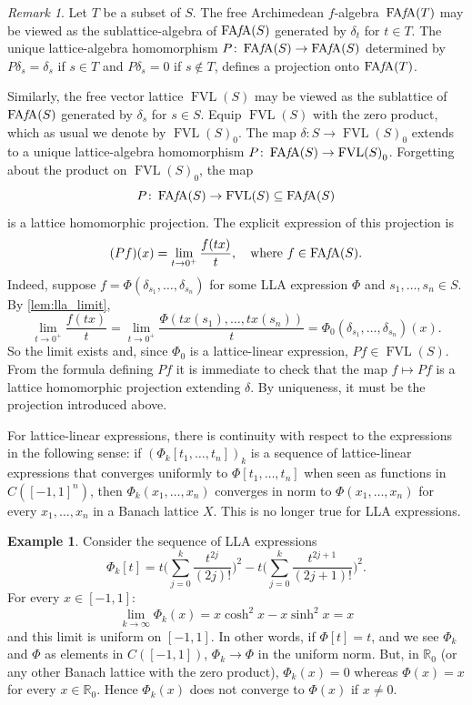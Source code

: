 \documentclass{memo-l}
\theoremstyle{definition}
\newtheorem{example}[theorem]{Example}
\theoremstyle{remark}
\newtheorem{rem}[theorem]{Remark}
\numberwithin{section}{chapter}
\numberwithin{equation}{chapter}
\newcommand\R{\ensuremath{\mathbb{R}}}
\newcommand{\falg}{$f\!$-algebra}
\newcommand{\FAFA}[1]{\operatorname{FA{\it f}\!A}(#1)}
\newcommand{\FVL}[1]{\operatorname{FVL}(#1)}
\begin{document}
\begin{rem}\label{rem:FVLinFAFA}
    Let $T$ be a subset of $S$. The free Archimedean \falg\ $\FAFA T$ may be viewed as the
    sublattice-algebra of $\FAFA S$ generated by $\delta _t$ for $t
    \in T$. The unique lattice-algebra homomorphism $P\colon \FAFA S\to \FAFA
    S$ determined by $P\delta _s=\delta _s$ if $s \in T$ and $P\delta
    _s=0$ if $s \not\in T$, defines a projection onto $\FAFA T$.

    Similarly, the free vector lattice $\FVL S$ may be viewed as the sublattice of $\FAFA S$
    generated by $\delta _s$ for $s \in S$. Equip $\FVL S$ with
    the zero product, which as usual we denote by ${\FVL S}_0$. The map $\delta \colon S\to {\FVL S}_0$
    extends to a unique lattice-algebra homomorphism $P\colon \FAFA S\to {\FVL S}_0$. Forgetting
    about the product on ${\FVL S}_0$, the map
    \[
    P\colon \FAFA S\to \FVL S \subseteq \FAFA S
    \]
    is a lattice homomorphic projection. The explicit expression of
    this projection is
    \[
        (Pf)(x)=
        \lim_{t\to 0^{+}}\frac{f(tx)}{t},\quad\text{where }f \in
        \FAFA S.
    \]
    Indeed, suppose $f=\Phi (\delta _{s_1},\ldots ,\delta _{s_n})$
    for some LLA expression $\Phi $ and $s_1,\ldots ,s_n \in S$. By
    \cref{lem:lla_limit},
    \[
    \lim_{t\to 0^{+}}\frac{f(tx)}{t}=\lim_{t\to 0^{+}} \frac{\Phi
    (tx(s_1),\ldots ,tx(s_n))}{t}=\Phi _0(\delta _{s_1},\ldots ,\delta
    _{s_n})(x).
    \]
    So the limit exists and, since $\Phi _0$ is a lattice-linear
    expression, $Pf \in \FVL S$. From the formula defining $Pf$ it is
    immediate to check that the map $f\mapsto Pf$ is a lattice
    homomorphic projection extending $\delta $. By uniqueness, it must
    be the projection introduced above.
\end{rem}

For lattice-linear expressions, there is continuity with respect to
the expressions in the following sense: if $(\Phi _k[t_1,\ldots
,t_n])_k$ is a sequence of lattice-linear expressions that converges
uniformly to $\Phi [t_1,\ldots ,t_n]$ when seen as functions in
$C([-1,1]^{n})$, then $\Phi _k(x_1,\ldots ,x_n)$ converges in norm to
$\Phi (x_1,\ldots ,x_n)$ for every $x_1,\ldots ,x_n$ in a Banach
lattice $X$. This is no longer true for LLA expressions.

\begin{example}
    Consider the sequence of LLA expressions
    \[
        \Phi_k [t]=t\bigg( \sum_{j=0}^{k} \frac{t^{2j}}{(2j)!} \bigg)
        ^2-t\bigg( \sum_{j=0}^{k} \frac{t^{2j+1}}{(2j+1)!} \bigg) ^2.
    \]
    For every $x \in [-1,1]$:
    \[
    \lim_{k\to \infty }\Phi _k(x)=x \cosh^2x - x\sinh^2x=x
    \]
    and this limit is uniform on $[-1,1]$. In other words, if $\Phi [t]=t$,
    and we see $\Phi _k$ and $\Phi $ as elements in $C([-1,1])$, $\Phi
    _k\to \Phi $ in the uniform norm. But, in $\R_0$ (or any other
    Banach lattice with the zero product), $\Phi _k(x)=0$ whereas
    $\Phi (x)=x$ for every $x \in \R_0$. Hence $\Phi _k(x)$ does not
    converge to $\Phi (x)$ if $x\neq 0$.
\end{example}
\end{document}
